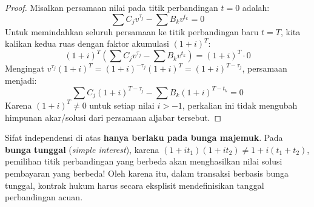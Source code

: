 \documentclass[11pt,a4paper]{article}
\begin{document}
\begin{proof}
Misalkan persamaan nilai pada titik perbandingan $t = 0$ adalah:
\begin{equation*}
    \sum C_j v^{\tau_j} - \sum B_k v^{t_k} = 0
\end{equation*}
Untuk memindahkan seluruh persamaan ke titik perbandingan baru $t = T$, kita kalikan kedua ruas dengan faktor akumulasi $(1 + i)^T$:
\begin{equation*}
    (1 + i)^T \left( \sum C_j v^{\tau_j} - \sum B_k v^{t_k} \right) = (1 + i)^T \cdot 0
\end{equation*}
Mengingat $v^{\tau_j} (1 + i)^T = (1 + i)^{-\tau_j} (1 + i)^T = (1 + i)^{T - \tau_j}$, persamaan menjadi:
\begin{equation*}
    \sum C_j (1 + i)^{T - \tau_j} - \sum B_k (1 + i)^{T - t_k} = 0
\end{equation*}
Karena $(1 + i)^T \neq 0$ untuk setiap nilai $i > -1$, perkalian ini tidak mengubah himpunan akar/solusi dari persamaan aljabar tersebut.
\end{proof}

\begin{notebox}
Sifat independensi di atas \textbf{hanya berlaku pada bunga majemuk}. Pada \textbf{bunga tunggal} (\textit{simple interest}), karena $(1 + it_1)(1 + it_2) \neq 1 + i(t_1 + t_2)$, pemilihan titik perbandingan yang berbeda akan menghasilkan nilai solusi pembayaran yang berbeda! Oleh karena itu, dalam transaksi berbasis bunga tunggal, kontrak hukum harus secara eksplisit mendefinisikan tanggal perbandingan acuan.
\end{notebox}
\end{document}
